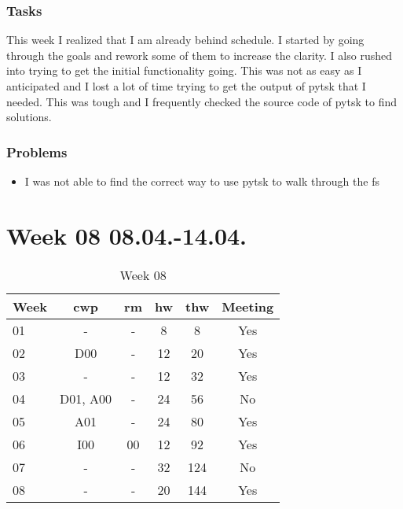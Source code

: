 \subsubsection{Tasks}

This week I realized that I am already behind schedule. I started by going through the goals and rework some of them to increase the clarity. I also rushed into trying to get the initial functionality going. This was not as easy as I anticipated and I lost a lot of time trying to get the output of \gls{pytsk} that I needed. This was tough and I frequently checked the source code of \gls{pytsk} to find solutions. 

\subsubsection{Problems}

\begin{itemize}
    \item I was not able to find the correct way to use \gls{pytsk} to walk through the \gls{fs}
\end{itemize}

\section{Week 08 08.04.-14.04.}
\label{sec:journal:week08}

\begin{table}[!ht]
    \begin{center}
        \caption{Week 08}
        \label{tab:journal:week08}
        \begin{tabular}{l|c|c|c|c|c}
            \textbf{Week} & \textbf{\gls{cwp}} & \textbf{\gls{rm}} & \textbf{\gls{hw}} & \textbf{\gls{thw}} & \textbf{Meeting}\\
        \hline
        01 & - & - & 8 & 8 & Yes \\
        02 & D00 & - & 12 & 20 & Yes \\
        03 & - & - & 12 & 32 & Yes \\
        04 & D01, A00 & - & 24 & 56 & No \\
        05 & A01 & - & 24 & 80 & Yes \\
        06 & I00 & 00 & 12 & 92 & Yes \\
        07 & - & - & 32 & 124 & No \\
        08 & - & - & 20 & 144 & Yes \\
        \end{tabular}
    \end{center}
\end{table}

